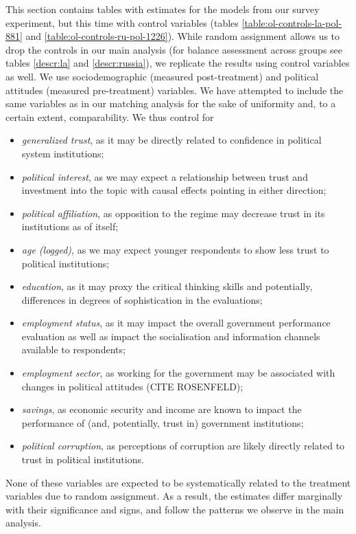 \documentclass[11pt, ngerman,english,a4]{article}
\begin{document}
This section contains tables with estimates for the models from our survey experiment, but this time with control variables (tables \ref{table:ol-controls-la-pol-881} and \ref{table:ol-controls-ru-pol-1226}). While random assignment allows us to drop the controls in our main analysis (for balance assessment across groups see tables \ref{descr:la} and \ref{descr:russia}), we replicate the results using control variables as well. We use sociodemographic (measured post-treatment) and political attitudes (measured pre-treatment) variables. We have attempted to include the same variables as in our matching analysis for the sake of uniformity and, to a certain extent, comparability. We thus control for 
\begin{itemize}
	\item \textit{generalized trust}, as it may be directly related to confidence in political system institutions; 
	\item \textit{political interest}, as we may expect a relationship between trust and investment into the topic with causal effects pointing in either direction; 
	\item \textit{political affiliation}, as opposition to the regime may decrease trust in its institutions as of itself; 
	\item \textit{age (logged)}, as we may expect younger respondents to show less trust to political institutions;
	\item \textit{education}, as it may proxy the critical thinking skills and potentially, differences in degrees of sophistication in the evaluations; 
	\item \textit{employment status}, as it may impact the overall government performance evaluation as well as impact the socialisation and information channels available to respondents; 
	\item \textit{employment sector}, as working for the government may be associated with changes in political attitudes (CITE ROSENFELD);
	\item \textit{savings}, as economic security and income are known to impact the performance of (and, potentially, trust in) government institutions;
	\item \textit{political corruption}, as perceptions of corruption are likely directly related to trust in political institutions.
\end{itemize}
None of these variables are expected to be systematically related to the treatment variables due to random assignment. As a result, the estimates differ marginally with their significance and signs, and follow the patterns we observe in the main analysis.
\end{document}
